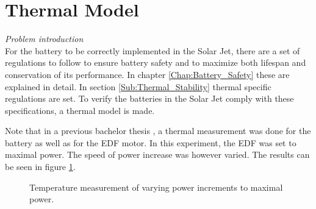 \section{Thermal Model}
\label{Chap:thermal_model}
\textit{Problem introduction}\\
For the battery to be correctly implemented in the Solar Jet, there are a set of regulations to follow to ensure battery safety and to maximize both lifespan and conservation of its performance. In chapter \ref{Chap:Battery_Safety} these are explained in detail. In section \ref{Sub:Thermal_Stability} thermal specific regulations are set. To verify the batteries in the Solar Jet comply with these specifications, a thermal model is made.

Note that in a previous bachelor thesis \cite{BEP_Rutger}, a thermal measurement was done for the battery as well as for the EDF motor. In this experiment, the EDF was set to maximal power. The speed of power increase was however varied. The results can be seen in figure \ref{Rutger_experiment}.

\begin{figure}[H]
  \centering
  \hfill
  \caption{Temperature measurement of varying power increments to maximal power.}
  \label{Rutger_experiment}
\end{figure}

